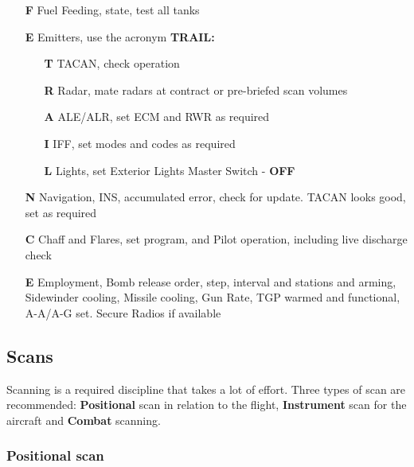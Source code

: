 \begin{enumerate}[
  align=parleft,
  itemsep=-0.25em,
  labelsep=0.25cm,
  leftmargin=*
]

  \item[\textbf{F}] Fuel Feeding, state, test all tanks
  \item[\textbf{E}] Emitters, use the acronym \textbf{TRAIL:}

  \begin{enumerate}[
    align=parleft,
    itemsep=-0.25em,
    labelsep=0.25cm,
    leftmargin=*
  ]
    \setlength\parskip{0.3em}

    \item[\textbf{T}] TACAN, check operation
    \item[\textbf{R}] Radar, mate radars at contract or pre-briefed scan
      volumes
    \item[\textbf{A}] ALE/ALR, set ECM and RWR as required
    \item[\textbf{I}] IFF, set modes and codes as required
    \item[\textbf{L}] Lights, set Exterior Lights Master Switch - \textbf{OFF}
  \end{enumerate}

  \item[\textbf{N}] Navigation, INS, accumulated error, check for update.
    TACAN looks good, set as required

  \item[\textbf{C}] Chaff and Flares, set program, and Pilot operation,
    including live discharge check

  \item[\textbf{E}] Employment, Bomb release order, step, interval and stations
    and arming, Sidewinder cooling, Missile cooling, Gun Rate, TGP warmed
    and functional, A-A/A-G set. Secure Radios if available

\end{enumerate}

\subsection{Scans}

Scanning is a required discipline that takes a lot of effort. Three types of
scan are recommended: \textbf{Positional} scan in relation to the flight,
\textbf{Instrument} scan for the aircraft and \textbf{Combat} scanning.

\subsubsection{Positional scan}

